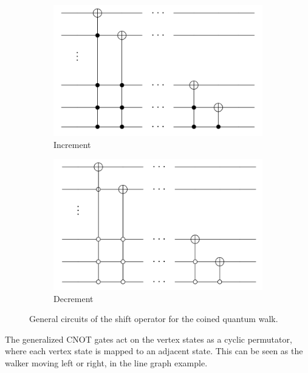 \documentclass[../../dissertation.tex]{subfiles}
\begin{document}
\begin{figure}[!h]
  \centering
  \begin{subfigure}[t]{.4\textwidth}
    \centering
    \includegraphics[width=\linewidth]{img/QCircuit/CoinedQuantumWalk/DouglasWangIncrement.png}
    \caption{Increment}
  \end{subfigure}
  \begin{subfigure}[t]{.4\textwidth}
    \centering
    \includegraphics[width=\linewidth]{img/QCircuit/CoinedQuantumWalk/DouglasWangDecrement.png}
    \caption{Decrement}
  \end{subfigure}
  \caption{General circuits of the shift operator for the coined quantum walk.}
  \label{fig:douglasWangShift}
\end{figure}
The generalized CNOT gates act on the vertex states as a cyclic permutator, where
each vertex state is mapped to an adjacent state. This can be seen as the walker moving
left or right, in the line graph example.
\end{document}
